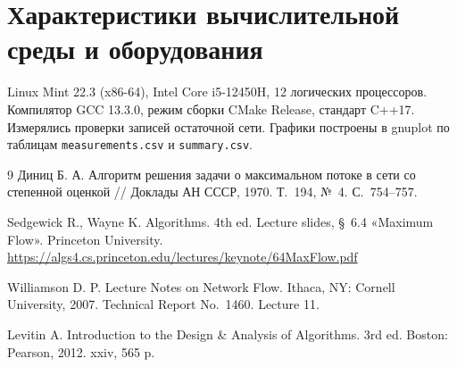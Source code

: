 \documentclass[14pt,a4paper]{extarticle}
\begin{document}
\section[Характеристики вычислительной среды и оборудования]
  {Характеристики вычислительной\\среды и оборудования}

Linux Mint 22.3 (x86-64), Intel Core i5-12450H, 12 логических процессоров. Компилятор GCC 13.3.0, режим сборки CMake Release, стандарт C++17. Измерялись проверки записей остаточной сети. Графики построены в gnuplot по таблицам \texttt{measurements.csv} и \texttt{summary.csv}.

\renewcommand{\refname}{Список литературы}
{}
\begin{thebibliography}{9}
Диниц Б. А. Алгоритм решения задачи о максимальном потоке в сети со степенной оценкой // Доклады АН СССР, 1970. Т.~194, №~4. С.~754--757.

\textenglish{Sedgewick R., Wayne K. Algorithms. 4th ed. Lecture slides, §~6.4 «Maximum Flow». Princeton University.}
\url{https://algs4.cs.princeton.edu/lectures/keynote/64MaxFlow.pdf}

\textenglish{Williamson D. P. Lecture Notes on Network Flow. Ithaca, NY: Cornell University, 2007. Technical Report No.~1460. Lecture 11.}

\textenglish{Levitin A. Introduction to the Design \& Analysis of Algorithms. 3rd ed. Boston: Pearson, 2012. xxiv, 565 p.}
\end{thebibliography}
\end{document}
